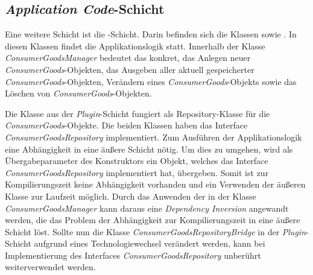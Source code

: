 \subsection*{\textit{Application Code}-Schicht}
Eine weitere Schicht ist die \href{https://github.com/lucasmerkel/dhbw-advancedswe-programmentwurf/tree/main/swe_programmentwurf/consumergoods-inventory-planner/2-cip-application}{}-Schicht.
Darin befinden sich die Klassen \href{https://github.com/lucasmerkel/dhbw-advancedswe-programmentwurf/blob/d5c89113d12c3b877ddc4d6a99225b277ddd468f/swe_programmentwurf/consumergoods-inventory-planner/2-cip-application/src/main/java/de/dhbw/cip/application/ConsumerGoodsManager.java}{} sowie \href{https://github.com/lucasmerkel/dhbw-advancedswe-programmentwurf/blob/d5c89113d12c3b877ddc4d6a99225b277ddd468f/swe_programmentwurf/consumergoods-inventory-planner/2-cip-application/src/main/java/de/dhbw/cip/application/StorageManager.java}{}.
In diesen Klassen findet die Applikationslogik statt.
Innerhalb der Klasse \textit{ConsumerGoodsManager} bedeutet das konkret, das Anlegen neuer \textit{ConsumerGoods}-Objekten, das Ausgeben aller aktuell gespeicherter \textit{ConsumerGoods}-Objekten, Verändern eines \textit{ConsumerGoods}-Objekts sowie das Löschen von \textit{ConsumerGoods}-Objekten.

Die Klasse \href{https://github.com/lucasmerkel/dhbw-advancedswe-programmentwurf/blob/d5c89113d12c3b877ddc4d6a99225b277ddd468f/swe_programmentwurf/consumergoods-inventory-planner/0-cip-plugins/src/main/java/de/dhbw/cip/plugins/persistence/hibernate/ConsumerGoodsRepositoryBridge.java}{} aus der \textit{Plugin}-Schicht fungiert als Repository-Klasse für die \textit{ConsumerGoods}-Objekte. Die beiden Klassen haben das Interface \textit{ConsumerGoodsRepository} implementiert.
Zum Ausführen der Applikationslogik eine Abhängigkeit in eine äußere Schicht nötig. 
Um dies zu umgehen, wird als Übergabeparameter des Konstruktors ein Objekt, welches das Interface \textit{ConsumerGoodsRepository} implementiert hat, übergeben.
Somit ist zur Kompilierungszeit keine Abhängigkeit vorhanden und ein Verwenden der äußeren Klasse zur Laufzeit möglich.
Durch das Anwenden der \href{https://github.com/lucasmerkel/dhbw-advancedswe-programmentwurf/blob/2bab7b1c200507e4550ce7025485261d0e95ce07/swe_programmentwurf/consumergoods-inventory-planner/2-cip-application/src/main/java/de/dhbw/cip/application/ConsumerGoodsManager.java#L18}{} in der Klasse \textit{ConsumerGoodsManager} kann daraus eine \textit{Dependency Inversion} angewandt werden, die das Problem der Abhängigkeit zur Kompilierungszeit in eine äußere Schicht löst.
Sollte nun die Klasse \textit{ConsumerGoodsRepositoryBridge} in der \textit{Plugin}-Schicht aufgrund eines Technologiewechsel verändert werden, kann bei Implementierung des Interfaces \textit{ConsumerGoodsRepository} unberührt weiterverwendet werden.


